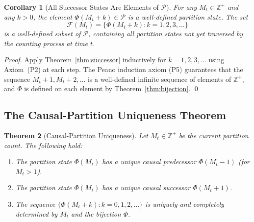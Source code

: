\documentclass[twocolumn,10pt,a4paper]{article}
\theoremstyle{thmstyle}
\newtheorem{theorem}{Theorem}[section]
\newtheorem{corollary}[theorem]{Corollary}
\theoremstyle{definition}
\theoremstyle{remark}
\newcommand{\Zp}{\mathbb{Z}^{+}}
\newcommand{\Parts}{\mathcal{P}}
\newcommand{\PhiMap}{\varPhi}
\begin{document}
\begin{corollary}[All Successor States Are Elements of $\Parts$]
\label{cor:all-successors}
For any $M_t \in \Zp$ and any $k > 0$, the element $\PhiMap(M_t + k) \in \Parts$ is a well-defined partition state. The set
\begin{equation}
    \mathcal{F}(M_t) = \{ \PhiMap(M_t + k) : k = 1, 2, 3, \ldots \}
\end{equation}
is a well-defined subset of $\Parts$, containing all partition states not yet traversed by the counting process at time $t$.
\end{corollary}

\begin{proof}
Apply Theorem~\ref{thm:successor} inductively for $k = 1, 2, 3, \ldots$ using Axiom~(P2) at each step. The Peano induction axiom (P5) guarantees that the sequence $M_t + 1, M_t + 2, \ldots$ is a well-defined infinite sequence of elements of $\Zp$, and $\PhiMap$ is defined on each element by Theorem~\ref{thm:bijection}. \qed
\end{proof}

\subsection{The Causal-Partition Uniqueness Theorem}

\begin{theorem}[Causal-Partition Uniqueness]
\label{thm:cpu}
Let $M_t \in \Zp$ be the current partition count. The following hold:
\begin{enumerate}[leftmargin=1.5em,label=(\roman*),itemsep=0.2em]
\item The partition state $\PhiMap(M_t)$ has a unique causal predecessor $\PhiMap(M_t - 1)$ (for $M_t > 1$).
\item The partition state $\PhiMap(M_t)$ has a unique causal successor $\PhiMap(M_t + 1)$.
\item The sequence $\{\PhiMap(M_t + k) : k = 0, 1, 2, \ldots\}$ is uniquely and completely determined by $M_t$ and the bijection $\PhiMap$.
\end{enumerate}
\end{theorem}
\end{document}
